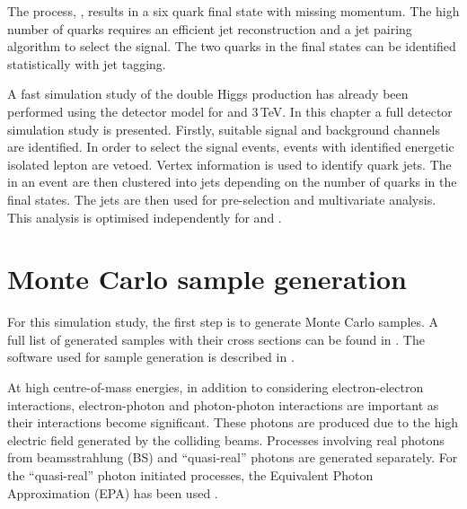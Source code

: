 The process, \eeToHHbbWWHadFull, results in a six quark final state with missing momentum. The high number of quarks requires an efficient jet reconstruction and a jet pairing algorithm to select the signal. The two \Pbottom quarks in the final states can be identified statistically with \Pbottom jet tagging. %

A fast simulation study of the double Higgs production has already been performed using the \CLICILD detector model for  and 3\,TeV\cite{Linssen:2012hp}. In this chapter a full \CLICILD detector simulation study is presented. Firstly, suitable signal and background channels are identified. In order to select the signal events, events with identified energetic isolated lepton are vetoed.  Vertex information is used to identify \Pbottom quark jets. The \PFOs in an event are then clustered into jets depending on the number of quarks in the final states. The jets are then used for pre-selection and multivariate analysis. This analysis is optimised independently for  and .





\section{Monte Carlo sample generation}


For this simulation study, the first step is to generate Monte Carlo samples. A full list of generated samples with their cross sections can be found in . The software used for sample generation is described in .

At high centre-of-mass energies, in addition to considering electron-electron interactions, electron-photon and photon-photon interactions are important as their interactions become significant. These photons are produced due to the high electric field generated by the colliding beams. Processes involving real photons from beamsstrahlung (BS) and ``quasi-real'' photons are generated separately. For the ``quasi-real'' photon initiated processes, the Equivalent Photon Approximation (EPA) has been used \cite{lyth:jpa00215525}.


